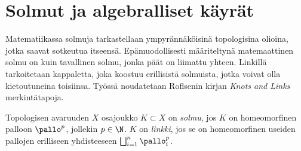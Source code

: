 \section{Solmut ja algebralliset käyrät}

Matematiikassa solmuja tarkastellaan ympyrännäköisinä topologisina olioina, jotka saavat sotkeutua itseensä. Epämuodollisesti määriteltynä matemaattinen solmu on kuin tavallinen solmu, jonka päät on liimattu yhteen. Linkillä tarkoitetaan kappaletta, joka koostuu erillisistä solmuista, jotka voivat olla kietoutuneina toisiinsa. Työssä noudatetaan Roflsenin kirjan \textit{Knots and Links} merkintätapoja.
\begin{definition}
    Topologisen avaruuden $X$ osajoukko $K\subset X$ on \textit{solmu}, jos $K$ on homeomorfinen palloon $\pallo^p$, jollekin $p\in\N$. $K$ on \textit{linkki}, jos se on homeomorfinen useiden pallojen erilliseen yhdisteeseen $\bigsqcup_{i=1}^n \pallo^p_i$.
\end{definition}

